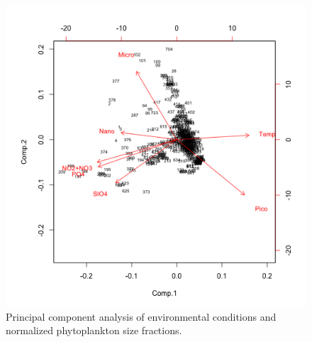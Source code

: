\begin{figure}
\centering
\includegraphics[trim = 0mm 0mm 0mm 0mm, clip, width=0.6\linewidth]{./Chp2-Pre/amt_PrinComp.png}
\caption[Scheme]{\small {Principal component analysis of environmental conditions and normalized phytoplankton size fractions.}}
\label{PrinComp}
\end{figure}

